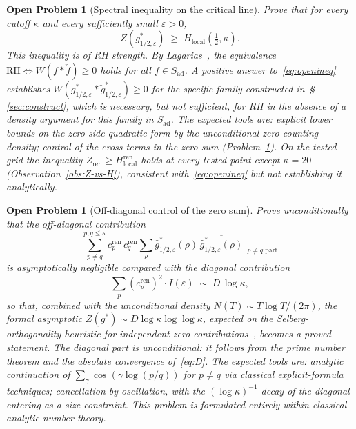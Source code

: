 \documentclass[11pt]{article}
\newtheorem{openproblem}[theorem]{Open Problem}
\newcommand{\Hlocal}{H_{\mathrm{local}}}
\newcommand{\Hren}{H_{\mathrm{local}}^{\mathrm{ren}}}
\newcommand{\Sad}{S_{\mathrm{ad}}}
\newcommand{\cren}{c_p^{\mathrm{ren}}}
\newcommand{\Zren}{Z_{\mathrm{ren}}}
\begin{document}
\begin{openproblem}[Spectral inequality on the critical line]\label{op:spectral-ineq}
Prove that for every cutoff $\kappa$ and every sufficiently
small $\varepsilon>0$,
\begin{equation}\label{eq:openineq}
Z(g^*_{1/2,\varepsilon}) \;\ge\; \Hlocal(\tfrac12,\kappa).
\end{equation}
This inequality is of RH strength.
By Lagarias~\cite{Lagarias}, the equivalence
$\mathrm{RH}\iff W(f*\check f)\ge 0$ holds for all
$f\in\Sad$.
A positive answer to~\eqref{eq:openineq} establishes
$W(g^*_{1/2,\varepsilon}*\check g^*_{1/2,\varepsilon})\ge 0$ for
the specific family constructed in~\S\,\ref{sec:construct},
which is necessary, but not sufficient, for RH in the absence
of a density argument for this family in $\Sad$.
The expected tools are: explicit lower bounds on the zero-side
quadratic form by the unconditional zero-counting density;
control of the cross-terms in the zero sum
(Problem~\ref{op:offdiag}).
On the tested grid the inequality $\Zren\ge\Hren$ holds at every
tested point except $\kappa=20$ (Observation~\ref{obs:Z-vs-H}),
consistent with~\eqref{eq:openineq} but not establishing it
analytically.
\end{openproblem}

\begin{openproblem}[Off-diagonal control of the zero sum]\label{op:offdiag}
Prove unconditionally that the off-diagonal contribution
\[
\sum_{p\ne q}^{p,q\le\kappa} \cren \, c_q^{\mathrm{ren}}
\sum_{\rho} \widehat g^*_{1/2,\varepsilon}(\rho)\,
            \overline{\widehat g^*_{1/2,\varepsilon}(\rho)}
\,\Big|_{p\ne q\text{ part}}
\]
is asymptotically negligible compared with the diagonal
contribution
\[
\sum_p (\cren)^2 \cdot I(\varepsilon)
\;\sim\; D\,\log\kappa,
\]
so that, combined with the unconditional density
$N(T)\sim T\log T/(2\pi)$, the formal asymptotic
$Z(g^*)\sim D\log\kappa\log\log\kappa$, expected on the
Selberg-orthogonality heuristic for independent zero
contributions~\cite{Selberg}, becomes a proved
statement.
The diagonal part is unconditional: it follows from the prime
number theorem and the absolute convergence
of~\eqref{eq:D}.
The expected tools are: analytic continuation of
$\sum_\gamma\cos(\gamma\log(p/q))$ for $p\ne q$ via classical
explicit-formula techniques; cancellation by oscillation, with
the $(\log\kappa)^{-1}$-decay of the diagonal entering as a
size constraint.
This problem is formulated entirely within classical analytic
number theory.
\end{openproblem}
\end{document}
